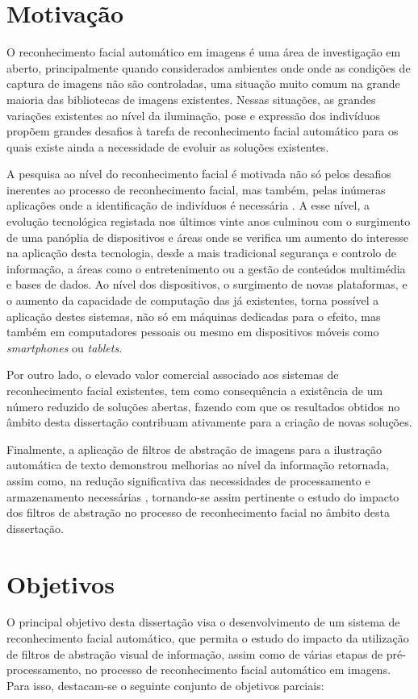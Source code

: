 \section{Motivação} \label{sec:motivation}
O reconhecimento facial automático em imagens é uma área de investigação em aberto, principalmente quando considerados ambientes onde onde as condições de captura de imagens não são controladas, uma situação muito comum na grande maioria das bibliotecas de imagens existentes. Nessas situações, as grandes variações existentes ao nível da iluminação, pose e expressão dos indivíduos propõem grandes desafios à tarefa de reconhecimento facial automático para os quais existe ainda a necessidade de evoluir as soluções existentes.

A pesquisa ao nível do reconhecimento facial é motivada não só pelos desafios inerentes ao processo de reconhecimento facial, mas também, pelas inúmeras aplicações onde a identificação de indivíduos é necessária \citep{Li2011}. A esse nível, a evolução tecnológica registada nos últimos vinte anos culminou com o surgimento de uma panóplia de dispositivos e áreas onde se verifica um aumento do interesse na aplicação desta tecnologia, desde a mais tradicional segurança e controlo de informação, a áreas como o entretenimento ou a gestão de conteúdos multimédia e bases de dados. Ao nível dos dispositivos, o surgimento de novas plataformas, e o aumento da capacidade de computação das já existentes, torna possível a aplicação destes sistemas, não só em máquinas dedicadas para o efeito, mas  também em computadores pessoais ou mesmo em dispositivos móveis como \textit{smartphones} ou \textit{tablets}.

Por outro lado, o elevado valor comercial associado aos sistemas de reconhecimento facial existentes, tem como  consequência a existência de um número reduzido de soluções abertas, fazendo com que os resultados obtidos no âmbito desta dissertação contribuam ativamente para a criação de novas soluções.

Finalmente, a aplicação de filtros de abstração de imagens para a ilustração automática de texto demonstrou melhorias ao  nível da informação retornada, assim como, na redução significativa das necessidades de processamento e armazenamento necessárias \citep{Coelho:2012:IAC:2260641.2260676}, tornando-se assim pertinente o estudo do impacto dos filtros de abstração no processo de reconhecimento facial no âmbito desta dissertação.

\section{Objetivos} \label{sec:objetivosintro}
O principal objetivo desta dissertação visa o desenvolvimento de um sistema de reconhecimento facial automático, que permita o estudo do impacto da utilização de filtros de abstração visual de informação, assim como de várias etapas de pré-processamento, no processo de reconhecimento facial automático em imagens. Para isso, destacam-se o seguinte conjunto de objetivos parciais:


